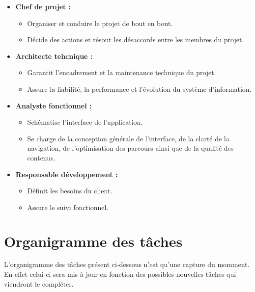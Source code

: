 \begin{itemize}
	\item  \textbf{Chef de projet :} \newline
	\begin{itemize}
		\item Organiser et conduire le projet de bout en bout.
		\item Décide des actions et résout les désaccords entre les membres du projet.\newline
	\end{itemize}

	\item \textbf{Architecte tehcnique :} \newline
	\begin{itemize}
		\item Garantit l'encadrement et la maintenance technique du projet.
		\item Assure la fiabilité, la performance et l'évolution du système d'information.\newline
	\end{itemize}
	\newpage

	\item \textbf{Analyste fonctionnel :} \newline
	\begin{itemize}
		\item Schématise l’interface de l’application.
		\item Se charge de la conception générale de l’interface, de la clarté de la
		navigation, de l’optimisation des parcours ainsi que de la qualité des
		contenus.\newline
	\end{itemize}
	
	\item \textbf{Responsable développement :} \newline
	\begin{itemize}
		\item Définit les besoins du client.
		\item Assure le suivi fonctionnel.\newline
	\end{itemize}
\end{itemize}

\chapter{Organigramme des tâches}
L'organigramme des tâches présent ci-dessous n'est qu'une capture du momment. En effet celui-ci sera mis à jour en fonction 
des possibles nouvelles tâches qui viendront le compléter.\newline

